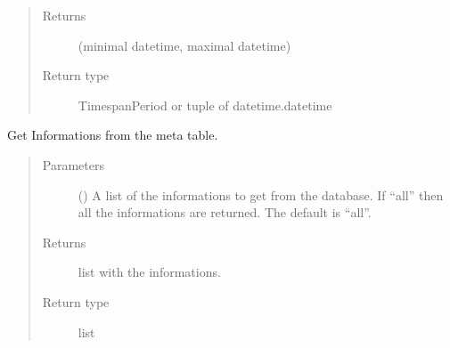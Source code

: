 \documentclass[letterpaper,10pt,english]{sphinxmanual}
\begin{document}
\begin{fulllineitems}
\begin{fulllineitems}
\begin{quote}
\begin{description}
\item[{Returns}] \leavevmode
\sphinxAtStartPar
(minimal datetime, maximal datetime)

\item[{Return type}] \leavevmode
\sphinxAtStartPar
TimespanPeriod or tuple of datetime.datetime

\end{description}\end{quote}

\end{fulllineitems}


\begin{fulllineitems}
\label{\detokenize{weatherDB:weatherDB.station.StationBase.get_ma}}
\end{fulllineitems}


\begin{fulllineitems}
\label{\detokenize{weatherDB:weatherDB.station.StationBase.get_meta}}
\sphinxAtStartPar
Get Informations from the meta table.
\begin{quote}\begin{description}
\item[{Parameters}] \leavevmode
\sphinxAtStartPar
{} (\sphinxstyleliteralemphasis{\sphinxupquote{, }}) \textendash{} A list of the informations to get from the database.
If “all” then all the informations are returned.
The default is “all”.

\item[{Returns}] \leavevmode
\sphinxAtStartPar
list with the informations.

\item[{Return type}] \leavevmode
\sphinxAtStartPar
list

\end{description}\end{quote}


\end{fulllineitems}
\end{fulllineitems}
\end{document}
